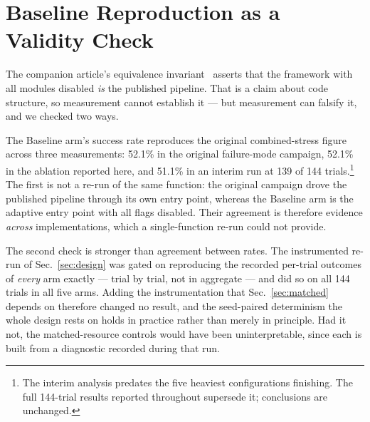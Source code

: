 \section{Baseline Reproduction as a Validity Check}
\label{sec:baselinecheck}

The companion article's equivalence invariant~\cite{methodpaper} asserts
that the framework with all modules disabled \emph{is} the published
pipeline. That is a claim about code
structure, so measurement cannot establish it --- but measurement can
falsify it, and we checked two ways.

The Baseline arm's success rate reproduces the original combined-stress
figure across three measurements: 52.1\% in the original failure-mode
campaign, 52.1\% in the ablation reported here, and 51.1\% in an interim
run at 139 of 144 trials.\footnote{The interim analysis predates the five
heaviest configurations finishing. The full 144-trial results reported
throughout supersede it; conclusions are unchanged.} The first is not a
re-run of the same function: the original campaign drove the published
pipeline through its own entry point, whereas the Baseline arm is the
adaptive entry point with all flags disabled. Their agreement is
therefore evidence \emph{across} implementations, which a single-function
re-run could not provide.

The second check is stronger than agreement between rates. The
instrumented re-run of Sec.~\ref{sec:design} was gated on reproducing the
recorded per-trial outcomes of \emph{every} arm exactly --- trial by
trial, not in aggregate --- and did so on all 144 trials in all five arms.
Adding the instrumentation that Sec.~\ref{sec:matched} depends on
therefore changed no result, and the seed-paired determinism the whole
design rests on holds in practice rather than merely in principle. Had it
not, the matched-resource controls would have been uninterpretable, since
each is built from a diagnostic recorded during that run.
